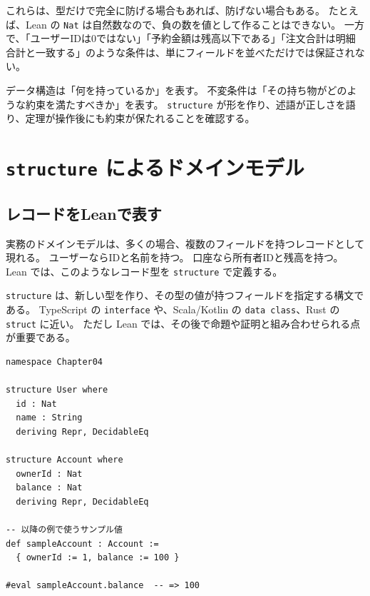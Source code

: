 これらは、型だけで完全に防げる場合もあれば、防げない場合もある。
たとえば、Lean の \texttt{Nat} は自然数なので、負の数を値として作ることはできない。
一方で、「ユーザーIDは0ではない」「予約金額は残高以下である」「注文合計は明細合計と一致する」のような条件は、単にフィールドを並べただけでは保証されない。

\begin{intuitionbox}
データ構造は「何を持っているか」を表す。
不変条件は「その持ち物がどのような約束を満たすべきか」を表す。
\texttt{structure} が形を作り、述語が正しさを語り、定理が操作後にも約束が保たれることを確認する。
\end{intuitionbox}


\section{\texttt{structure} によるドメインモデル}

\subsection{レコードをLeanで表す}

実務のドメインモデルは、多くの場合、複数のフィールドを持つレコードとして現れる。
ユーザーならIDと名前を持つ。
口座なら所有者IDと残高を持つ。
Lean では、このようなレコード型を \texttt{structure} で定義する。

\begin{leanbox}
\texttt{structure} は、新しい型を作り、その型の値が持つフィールドを指定する構文である。
TypeScript の \texttt{interface} や、Scala/Kotlin の \texttt{data class}、Rust の \texttt{struct} に近い。
ただし Lean では、その後で命題や証明と組み合わせられる点が重要である。
\end{leanbox}

\begin{listing}[htbp]
\begin{verbatim}
namespace Chapter04

structure User where
  id : Nat
  name : String
  deriving Repr, DecidableEq

structure Account where
  ownerId : Nat
  balance : Nat
  deriving Repr, DecidableEq

-- 以降の例で使うサンプル値
def sampleAccount : Account :=
  { ownerId := 1, balance := 100 }

#eval sampleAccount.balance  -- => 100
\end{verbatim}
\caption{ユーザーと口座の小さなドメインモデル}
\label{lst:ch04_structure_model}
\end{listing}

